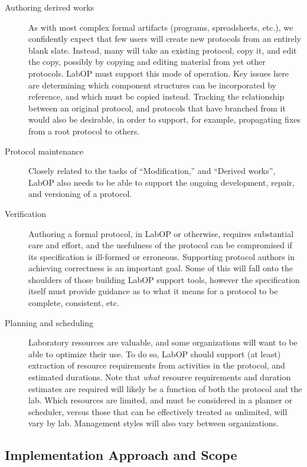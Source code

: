 \begin{description}
\item[Authoring derived works] As with most complex formal artifacts (programs, spreadsheets, etc.), we confidently expect that few users will create new protocols from an entirely blank slate.  
Instead, many will take an existing protocol, copy it, and edit the copy, possibly by copying and editing material from yet other protocols.  LabOP must support this mode of operation.  
Key issues here are determining which component structures can be incorporated by reference, and which must be copied instead.  Tracking the relationship between an original protocol, and protocols that have branched from it would also be desirable, in order to support, for example, propagating fixes from a root protocol to others.

\item[Protocol maintenance] Closely related to the tasks of ``Modification,'' and ``Derived works'', LabOP also needs to be able to support the ongoing development, repair, and versioning of a protocol.

\item[Verification] Authoring a formal protocol, in LabOP or otherwise, requires substantial care and effort, and the usefulness of the protocol can be compromised if its specification is ill-formed or erroneous.  
Supporting protocol authors in achieving correctness is an important goal. 
Some of this will fall onto the shoulders of those building LabOP support tools, however the specification itself must provide guidance as to what it means for a protocol to be complete, consistent, etc.

\item[Planning and scheduling] Laboratory resources are valuable, and some organizations will want to be able to optimize their use. 
To do so, LabOP should support (at least) extraction of resource requirements from activities in the protocol, and estimated durations.  Note that \emph{what} resource requirements and duration estimates are required will likely be a function of both the protocol and the lab.  
Which resources are limited, and must be considered in a planner or scheduler, versus those that can be effectively treated as unlimited, will vary by lab.  Management styles will also vary between organizations.

\end{description}

\subsection{Implementation Approach and Scope}

